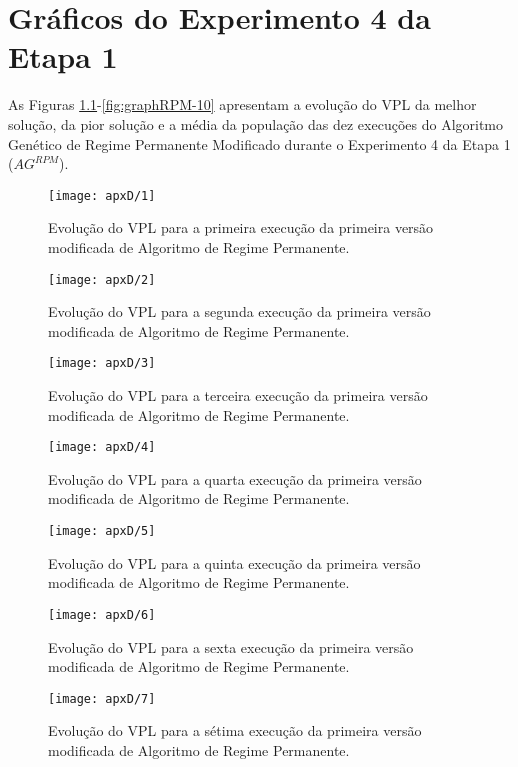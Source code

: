 
\chapter{Gráficos do Experimento 4 da Etapa 1}

As Figuras \ref{fig:graphRPM-01}-\ref{fig:graphRPM-10} apresentam a evolução do VPL da melhor solução, da pior solução e a média da população das dez execuções do Algoritmo Genético de Regime Permanente Modificado durante o Experimento 4 da Etapa 1 ($AG^{RPM}$).

\begin{figure}[H]
\centering
\texttt{[image: apxD/1]}
\caption{Evolução do VPL para a primeira execução da primeira versão modificada de Algoritmo de Regime Permanente.}
\label{fig:graphRPM-01}
\end{figure}

\begin{figure}[H]
\centering
\texttt{[image: apxD/2]}
\caption{Evolução do VPL para a segunda execução da primeira versão modificada de Algoritmo de Regime Permanente.}
\label{fig:graphRPM-02}
\end{figure}

\begin{figure}[H]
\centering
\texttt{[image: apxD/3]}
\caption{Evolução do VPL para a terceira execução da primeira versão modificada de Algoritmo de Regime Permanente.}
\label{fig:graphRPM-03}
\end{figure}

\begin{figure}[H]
\centering
\texttt{[image: apxD/4]}
\caption{Evolução do VPL para a quarta execução da primeira versão modificada de Algoritmo de Regime Permanente.}
\label{fig:graphRPM-04}
\end{figure}

\begin{figure}[H]
\centering
\texttt{[image: apxD/5]}
\caption{Evolução do VPL para a quinta execução da primeira versão modificada de Algoritmo de Regime Permanente.}
\label{fig:graphRPM-05}
\end{figure}

\begin{figure}[H]
\centering
\texttt{[image: apxD/6]}
\caption{Evolução do VPL para a sexta execução da primeira versão modificada de Algoritmo de Regime Permanente.}
\label{fig:graphRPM-06}
\end{figure}

\begin{figure}[H]
\centering
\texttt{[image: apxD/7]}
\caption{Evolução do VPL para a sétima execução da primeira versão modificada de Algoritmo de Regime Permanente.}
\label{fig:graphRPM-07}
\end{figure}

